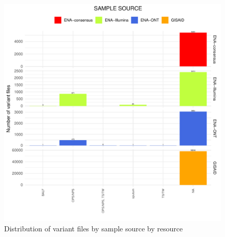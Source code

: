 \documentclass[a4paper, 10pt]{article}        %
\begin{document}
 
   \begin{figure}[!htb]
     \centering
       \includegraphics[width=1\textwidth]{all_sample_res_facet.pdf}
     \caption{Distribution of variant files by sample source by resource}
     \label{fig:illu}
 \end{figure}
\end{document}
